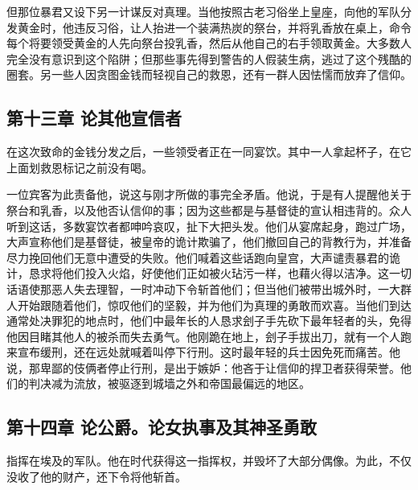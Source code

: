 但那位暴君又设下另一计谋反对真理。当他按照古老习俗坐上皇座，向他的军队分发黄金时，他违反习俗，让人抬进一个装满热炭的祭台，并将乳香放在桌上，命令每个将要领受黄金的人先向祭台投乳香，然后从他自己的右手领取黄金。大多数人完全没有意识到这个陷阱；但那些事先得到警告的人假装生病，逃过了这个残酷的圈套。另一些人因贪图金钱而轻视自己的救恩，还有一群人因怯懦而放弃了信仰。\par


\subsection{第十三章 论其他宣信者}

在这次致命的金钱分发之后，一些领受者正在一同宴饮。其中一人拿起杯子，在它上面划救恩标记之前没有喝。\par

一位宾客为此责备他，说这与刚才所做的事完全矛盾。他说，于是有人提醒他关于祭台和乳香，以及他否认信仰的事；因为这些都是与基督徒的宣认相违背的。众人听到这话，多数宴饮者都呻吟哀叹，扯下大把头发。他们从宴席起身，跑过广场，大声宣称他们是基督徒，被皇帝的诡计欺骗了，他们撤回自己的背教行为，并准备尽力挽回他们无意中遭受的失败。他们喊着这些话跑向皇宫，大声谴责暴君的诡计，恳求将他们投入火焰，好使他们正如被火玷污一样，也藉火得以洁净。这一切话语使那恶人失去理智，一时冲动下令斩首他们；但当他们被带出城外时，一大群人开始跟随着他们，惊叹他们的坚毅，并为他们为真理的勇敢而欢喜。当他们到达通常处决罪犯的地点时，他们中最年长的人恳求刽子手先砍下最年轻者的头，免得他因目睹其他人的被杀而失去勇气。他刚跪在地上，刽子手拔出刀，就有一个人跑来宣布缓刑，还在远处就喊着叫停下行刑。这时最年轻的兵士因免死而痛苦。他说，那卑鄙的伎俩者停止行刑，是出于嫉妒：他吝于让信仰的捍卫者获得荣誉。他们的判决减为流放，被驱逐到城墙之外和帝国最偏远的地区。\par


\subsection{第十四章 论公爵。论女执事及其神圣勇敢}

指挥在埃及的军队。他在时代获得这一指挥权，并毁坏了大部分偶像。为此，不仅没收了他的财产，还下令将他斩首。\par

